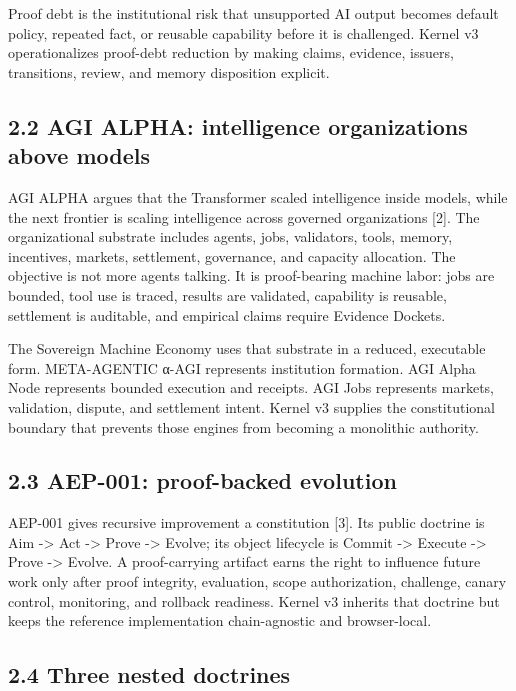 Proof debt is the institutional risk that unsupported AI output becomes
default policy, repeated fact, or reusable capability before it is
challenged. Kernel v3 operationalizes proof-debt reduction by making
claims, evidence, issuers, transitions, review, and memory disposition
explicit.

\subsection{2.2 AGI ALPHA: intelligence organizations above
models}\label{agi-alpha-intelligence-organizations-above-models}

AGI ALPHA argues that the Transformer scaled intelligence inside models,
while the next frontier is scaling intelligence across governed
organizations {[}2{]}. The organizational substrate includes agents,
jobs, validators, tools, memory, incentives, markets, settlement,
governance, and capacity allocation. The objective is not more agents
talking. It is proof-bearing machine labor: jobs are bounded, tool use
is traced, results are validated, capability is reusable, settlement is
auditable, and empirical claims require Evidence Dockets.

The Sovereign Machine Economy uses that substrate in a reduced,
executable form. META-AGENTIC α-AGI represents institution formation.
AGI Alpha Node represents bounded execution and receipts. AGI Jobs
represents markets, validation, dispute, and settlement intent. Kernel
v3 supplies the constitutional boundary that prevents those engines from
becoming a monolithic authority.

\subsection{2.3 AEP-001: proof-backed
evolution}\label{aep-001-proof-backed-evolution}

AEP-001 gives recursive improvement a constitution {[}3{]}. Its public
doctrine is Aim -\textgreater{} Act -\textgreater{} Prove
-\textgreater{} Evolve; its object lifecycle is Commit -\textgreater{}
Execute -\textgreater{} Prove -\textgreater{} Evolve. A proof-carrying
artifact earns the right to influence future work only after proof
integrity, evaluation, scope authorization, challenge, canary control,
monitoring, and rollback readiness. Kernel v3 inherits that doctrine but
keeps the reference implementation chain-agnostic and browser-local.

\subsection{2.4 Three nested doctrines}\label{three-nested-doctrines}


